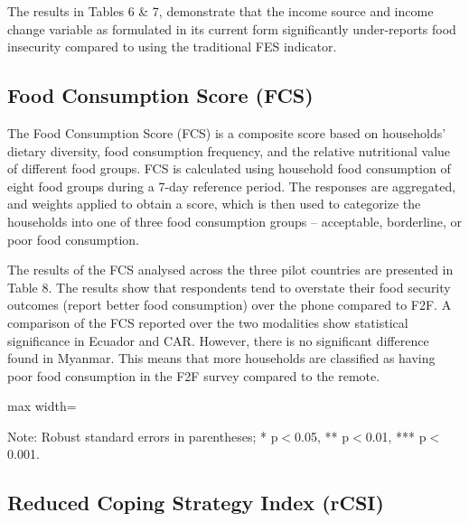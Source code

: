 \documentclass[11pt,harvard]{article}
\begin{document}
	
The results in Tables 6 \& 7, demonstrate that the income source and income change variable as formulated in its current form significantly under-reports food insecurity compared to using the traditional FES indicator.
		

\subsection{Food Consumption Score (FCS)}
	
The Food Consumption Score (FCS) is a composite score based on households’ dietary diversity, food consumption frequency, and the relative nutritional value of different food groups. FCS is calculated using household food consumption of eight food groups during a 7-day reference period. The responses are aggregated, and weights applied to obtain a score, which is then used to categorize the households into one of three food consumption groups – acceptable, borderline, or poor food consumption.

The results of the FCS analysed across the three pilot countries are presented in Table 8. The results show that respondents tend to overstate their food security outcomes (report better food consumption) over the phone compared to F2F. A comparison of the FCS reported over the two modalities show statistical significance in Ecuador and CAR. However, there is no significant difference found in Myanmar. This means that more households are classified as having poor food consumption in the F2F survey compared to the remote.

	
	\begin{table}[htbp]
		\centering
		\begin{adjustbox}{max width=\textwidth}
			\begin{threeparttable}
				\caption{Impact of Survey Modality on Food Consumption Score and Groups}
				\scriptsize
				 
				\label{tab:FCS_Modality_All_Country}
				\begin{tablenotes}
					\item Note: Robust standard errors in parentheses; * p$<$0.05, ** p$<$0.01, *** p$<$0.001. 
				\end{tablenotes}
			\end{threeparttable}
		\end{adjustbox}
	\end{table}
	
	\pagebreak
	
\subsection{Reduced Coping Strategy Index (rCSI)}
	
\end{document}
